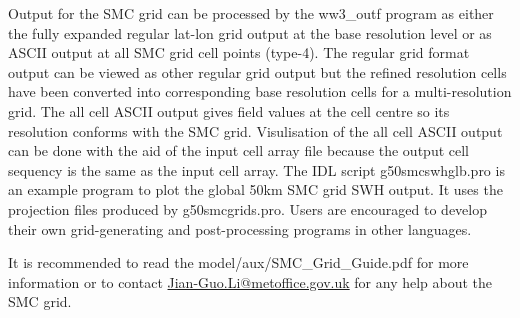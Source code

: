 Output for the SMC grid can be processed by the ww3\_outf program
as either the fully expanded regular lat-lon grid output at the base
resolution level or as ASCII output at all SMC grid cell points (type-4).
The regular grid format output can be viewed as other regular grid
output but the refined resolution cells have been converted into 
corresponding base resolution cells for a multi-resolution grid. 
The all cell ASCII output gives field values at the cell centre
so its resolution conforms with the SMC grid. Visulisation of the
all cell ASCII output can be done with the aid of the input cell array
file because the output cell sequency is the same as the input cell
array. The IDL script g50smcswhglb.pro is an example program to plot
the global 50km SMC grid SWH output. It uses the projection files
produced by g50smcgrids.pro. Users are encouraged to develop their
own grid-generating and post-processing programs in other languages.

It is recommended to read the model/aux/SMC\_Grid\_Guide.pdf for
more information or to contact \url{Jian-Guo.Li@metoffice.gov.uk} 
for any help about the SMC grid.

